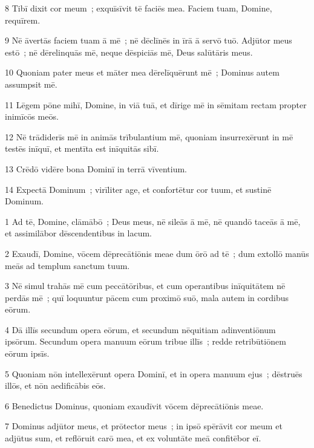 \psalmVerse
  {\phantom{00}8}
  {Tibī dixit cor meum~; exquīsīvit tē faciēs mea. Faciem tuam, Domine, requīrem.}


\psalmVerse
  {\phantom{00}9}
  {Nē āvertās faciem tuam ā mē~; nē dēclīnēs in īrā ā servō tuō. Adjūtor meus estō~; nē dērelinquās mē, neque dēspiciās mē, Deus salūtāris meus.}


\psalmVerse
  {\phantom{0}10}
  {Quoniam pater meus et māter mea dērelīquērunt mē~; Dominus autem assumpsit mē.}


\psalmVerse
  {\phantom{0}11}
  {Lēgem pōne mihī, Domine, in viā tuā, et dīrige mē in sēmitam rectam propter inimīcōs meōs.}


\psalmVerse
  {\phantom{0}12}
  {Nē trādiderīs mē in animās trībulantium mē, quoniam insurrexērunt in mē testēs inīquī, et mentīta est inīquitās sibī.}


\psalmVerse
  {\phantom{0}13}
  {Crēdō vidēre bona Dominī in terrā vīventium.}


\psalmVerse
  {\phantom{0}14}
  {Expectā Dominum~; virīliter age, et confortētur cor tuum, et sustinē Dominum.}




\psalmVerse
  {\phantom{00}1}
  {Ad tē, Domine, clāmābō~; Deus meus, nē sileās ā mē, nē quandō taceās ā mē, et assimilābor dēscendentibus in lacum.}


\psalmVerse
  {\phantom{00}2}
  {Exaudī, Domine, vōcem dēprecātiōnis meae dum ōrō ad tē~; dum extollō manūs meās ad templum sanctum tuum.}


\psalmVerse
  {\phantom{00}3}
  {Nē simul trahās mē cum peccātōribus, et cum operantibus inīquitātem nē perdās mē~; quī loquuntur pācem cum proximō suō, mala autem in cordibus eōrum.}


\psalmVerse
  {\phantom{00}4}
  {Dā illīs secundum opera eōrum, et secundum nēquitiam adinventiōnum ipsōrum. Secundum opera manuum eōrum tribue illīs~; redde retribūtiōnem eōrum ipsīs.}


\psalmVerse
  {\phantom{00}5}
  {Quoniam nōn intellexērunt opera Dominī, et in opera manuum ejus~; dēstruēs illōs, et nōn aedificābis eōs.}


\psalmVerse
  {\phantom{00}6}
  {Benedictus Dominus, quoniam exaudīvit vōcem dēprecātiōnis meae.}


\psalmVerse
  {\phantom{00}7}
  {Dominus adjūtor meus, et prōtector meus~; in ipsō spērāvit cor meum et adjūtus sum, et reflōruit carō mea, et ex voluntāte meā confitēbor eī.}


